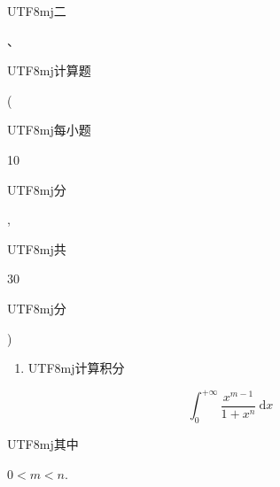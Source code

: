 \documentclass[10pt]{article}
\begin{document}
\begin{CJK}{UTF8}{mj}二\end{CJK}、\begin{CJK}{UTF8}{mj}计算题\end{CJK} (\begin{CJK}{UTF8}{mj}每小题\end{CJK} 10 \begin{CJK}{UTF8}{mj}分\end{CJK}, \begin{CJK}{UTF8}{mj}共\end{CJK} 30 \begin{CJK}{UTF8}{mj}分\end{CJK})

\begin{enumerate}
  \item \begin{CJK}{UTF8}{mj}计算积分\end{CJK}
\end{enumerate}
$$
\int_{0}^{+\infty} \frac{x^{m-1}}{1+x^{n}} \mathrm{~d} x
$$
\begin{CJK}{UTF8}{mj}其中\end{CJK} $0<m<n$.
\end{document}
